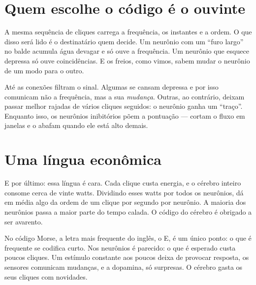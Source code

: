 
\section*{Quem escolhe o código é o ouvinte}

A mesma sequência de cliques carrega a frequência, os instantes e a ordem. O que disso será lido é o destinatário quem decide. Um neurônio com um ``furo largo'' no balde acumula água devagar e só ouve a frequência. Um neurônio que esquece depressa só ouve coincidências. E os freios, como vimos, sabem mudar o neurônio de um modo para o outro.

Até as conexões filtram o sinal. Algumas se cansam depressa e por isso comunicam não a frequência, mas a sua \emph{mudança}. Outras, ao contrário, deixam passar melhor rajadas de vários cliques seguidos: o neurônio ganha um ``traço''. Enquanto isso, os neurônios inibitórios põem a pontuação --- cortam o fluxo em janelas e o abafam quando ele está alto demais.

\section*{Uma língua econômica}

E por último: essa língua é cara. Cada clique custa energia, e o cérebro inteiro consome cerca de vinte watts. Dividindo esses watts por todos os neurônios, dá em média algo da ordem de um clique por segundo por neurônio. A maioria dos neurônios passa a maior parte do tempo calada. O código do cérebro é obrigado a ser avarento.

No código Morse, a letra mais frequente do inglês, o E, é um único ponto: o que é frequente se codifica curto. Nos neurônios é parecido: o que é esperado custa poucos cliques. Um estímulo constante aos poucos deixa de provocar resposta, os sensores comunicam mudanças, e a dopamina, só surpresas. O cérebro gasta os seus cliques com novidades.


